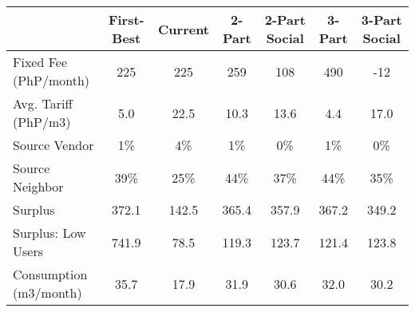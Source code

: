 \begin{tabular}{lcccccc}
  & First-Best & Current & 2-Part  & 2-Part Social  & 3-Part & 3-Part Social \\
\hline
\hline
Fixed Fee (PhP/month) &225&225&259&108&490&-12\\
Avg. Tariff (PhP/m3) &5.0&22.5&10.3&13.6&4.4&17.0\\
Source Vendor &1\% &4\% &1\% &0\% &1\% &0\%\\
Source Neighbor &39\% &25\% &44\% &37\% &44\% &35\%\\
Surplus &372.1&142.5&365.4&357.9&367.2&349.2\\
Surplus: Low Users &741.9&78.5&119.3&123.7&121.4&123.8\\
Consumption (m3/month) &35.7&17.9&31.9&30.6&32.0&30.2\\
\hline
\end{tabular}
